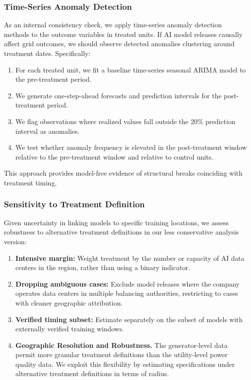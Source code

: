 \documentclass[a4paper,fleqn,longmktitle]{cas-sc}
\begin{document}
\subsubsection{Time-Series Anomaly Detection}

As an internal consistency check, we apply time-series anomaly detection methods to the outcome variables in treated units. If AI model releases causally affect grid outcomes, we should observe detected anomalies clustering around treatment dates. Specifically:
\begin{enumerate}
    \item For each treated unit, we fit a baseline time-series seasonal ARIMA model to the pre-treatment period.
    \item We generate one-step-ahead forecasts and prediction intervals for the post-treatment period.
    \item We flag observations where realized values fall outside the 20\% prediction interval as anomalies.
    \item We test whether anomaly frequency is elevated in the post-treatment window relative to the pre-treatment window and relative to control units.
\end{enumerate}
This approach provides model-free evidence of structural breaks coinciding with treatment timing.

\subsubsection{Sensitivity to Treatment Definition}

Given uncertainty in linking models to specific training locations, we assess robustness to alternative treatment definitions in our less conservative analysis version:
\begin{enumerate}
    \item \textbf{Intensive margin:} Weight treatment by the number or capacity of AI data centers in the region, rather than using a binary indicator.
    \item \textbf{Dropping ambiguous cases:} Exclude model releases where the company operates data centers in multiple balancing authorities, restricting to cases with cleaner geographic attribution.
    \item \textbf{Verified timing subset:} Estimate separately on the subset of models with externally verified training windows.
    \item \textbf{Geographic Resolution and Robustness.} The generator-level data permit more granular treatment definitions than the utility-level power quality data. We exploit this flexibility by estimating specifications under alternative treatment definitions in terms of radius.
\end{enumerate}
\end{document}
